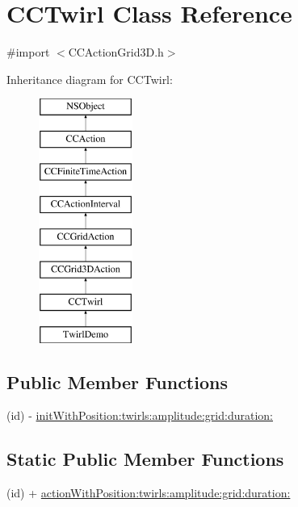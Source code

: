 \hypertarget{interface_c_c_twirl}{\section{C\-C\-Twirl Class Reference}
\label{interface_c_c_twirl}
}


{\ttfamily \#import $<$C\-C\-Action\-Grid3\-D.\-h$>$}

Inheritance diagram for C\-C\-Twirl\-:\begin{figure}[H]
\begin{center}
\leavevmode
\includegraphics[height=8.000000cm]{interface_c_c_twirl}
\end{center}
\end{figure}
\subsection*{Public Member Functions}
\begin{DoxyCompactItemize}
\item 
(id) -\/ \hyperlink{interface_c_c_twirl_af0cabbb1ec79e2053bd14024896045f2}{init\-With\-Position\-:twirls\-:amplitude\-:grid\-:duration\-:}
\end{DoxyCompactItemize}
\subsection*{Static Public Member Functions}
\begin{DoxyCompactItemize}
\item 
(id) + \hyperlink{interface_c_c_twirl_a4f00e64ad1d7068b02848fd8647c6ecd}{action\-With\-Position\-:twirls\-:amplitude\-:grid\-:duration\-:}
\end{DoxyCompactItemize}
